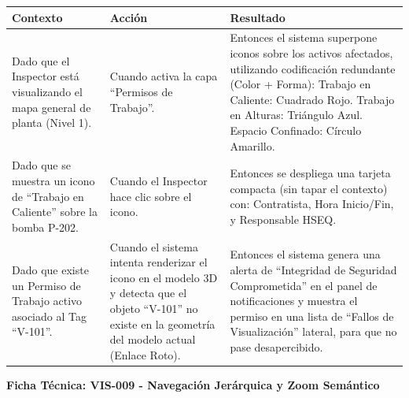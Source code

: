\footnotesize\begin{longtable}{|p{0.28\textwidth}|p{0.32\textwidth}|p{0.34\textwidth}|}\hline
\textbf{Contexto} & \textbf{Acción} & \textbf{Resultado} \\ \hline
\parbox[t]{\linewidth}{Dado que el Inspector está visualizando el mapa general de planta (Nivel 1).} & \parbox[t]{\linewidth}{Cuando activa la capa ``Permisos de Trabajo''.} & \parbox[t]{\linewidth}{Entonces el sistema superpone iconos sobre los activos afectados, utilizando codificación redundante (Color + Forma): Trabajo en Caliente: Cuadrado Rojo. Trabajo en Alturas: Triángulo Azul. Espacio Confinado: Círculo Amarillo.} \\ \hline
\parbox[t]{\linewidth}{Dado que se muestra un icono de ``Trabajo en Caliente'' sobre la bomba P-202.} & \parbox[t]{\linewidth}{Cuando el Inspector hace clic sobre el icono.} & \parbox[t]{\linewidth}{Entonces se despliega una tarjeta compacta (sin tapar el contexto) con: Contratista, Hora Inicio/Fin, y Responsable HSEQ.} \\ \hline
\parbox[t]{\linewidth}{Dado que existe un Permiso de Trabajo activo asociado al Tag ``V-101''.} & \parbox[t]{\linewidth}{Cuando el sistema intenta renderizar el icono en el modelo 3D y detecta que el objeto ``V-101'' no existe en la geometría del modelo actual (Enlace Roto).} & \parbox[t]{\linewidth}{Entonces el sistema genera una alerta de ``Integridad de Seguridad Comprometida'' en el panel de notificaciones y muestra el permiso en una lista de ``Fallos de Visualización'' lateral, para que no pase desapercibido.} \\ \hline
\end{longtable}\normalsize
\vspace{1em}
\noindent\textbf{Ficha Técnica: VIS-009 - Navegación Jerárquica y Zoom Semántico}
\footnotesize\setlength{\tabcolsep}{4pt}\renewcommand{\arraystretch}{1.2}
